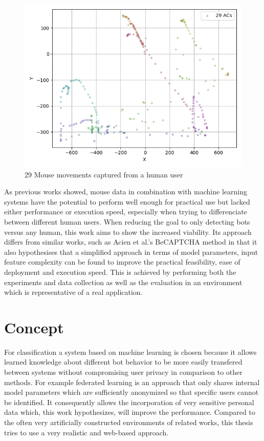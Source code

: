 \documentclass[
    fontsize=12pt,
    headings=small,
    parskip=half,           %
    bibliography=totoc,
    numbers=noenddot,       %
    open=any,               %
    final,                   %
    table
]{scrreprt}
\begin{document}
\begin{figure}[h]
    \includegraphics[width=\textwidth]{figures/user_mouse_heatmap.png}
    \caption{29 Mouse movements captured from a human user}
    \label{fig:user_mouse_heatmap}
\end{figure}

As previous works showed, mouse data in combination with machine learning systems have the potential to perform well enough for practical use but lacked either performance or execution speed, especially when trying to differenciate between different human users. When reducing the goal to only detecting bots versus any human, this work aims to show the increased viability. Its approach differs from similar works, such as Acien et al.'s BeCAPTCHA method \cite{Acien2020BeCAPTCHAMouseSM} in that it also hypothesises that a simplified approach in terms of model parameters, input feature complexity can be found to improve the practical feasibility, ease of deployment and execution speed. This is achieved by performing both the experiments and data collection as well as the evaluation in an environment which is representative of a real application.


\section{Concept}

For classification a system based on machine learning is chosen because it allows learned knowledge about different bot behavior to be more easily transfered between systems without compromising user privacy in comparison to other methods. For example federated learning \cite{DBLP:journals/corr/KonecnyMR15} \cite{DBLP:journals/corr/KonecnyMRR16} is an approach that only shares internal model parameters which are sufficiently anonymized so that specific users cannot be identified. It consequently allows the incorporation of very sensitive personal data which, this work hypothesizes, will improve the performance. Compared to the often very artificially constructed environments of related works, this thesis tries to use a very realistic and web-based approach.
\end{document}
